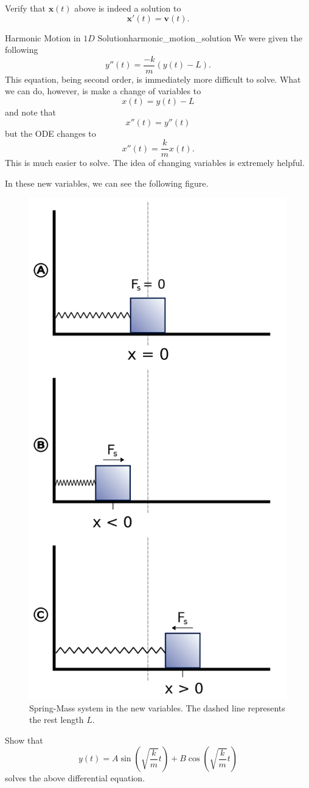         \begin{exercise}
        Verify that $\mathbf{x}(t)$ above is indeed a solution to 
        \[
        \mathbf{x}'(t)=\mathbf{v}(t).
        \]
        \end{exercise}
        
        \begin{ex}{Harmonic Motion in $1D$ Solution}{harmonic_motion_solution}
        We were given the following
        \[
        y''(t) = \frac{-k}{m} (y(t)-L).
        \]
        This equation, being second order, is immediately more difficult to solve.  What we can do, however, is make a change of variables to
        \[
        x(t)=y(t)-L
        \]
        and note that
        \[
        x''(t)=y''(t)
        \]
        but the ODE changes to
        \[
        x''(t)=\frac{k}{m}x(t).
        \]
        This is much easier to solve.  The idea of changing variables is extremely helpful.
        
        In these new variables, we can see the following figure.
        \begin{figure}[H]
            \centering
            \includegraphics[width=.4\textwidth]{Figures/spring-mass.png}
            \caption{Spring-Mass system in the new variables. The dashed line represents the rest length $L$.}
            \label{fig:my_label}
        \end{figure}
        \end{ex}
        
        \begin{exercise}
        Show that
        \[
        y(t) = A\sin\left(\sqrt{\frac{k}{m}}t\right)+B\cos\left( \sqrt{\frac{k}{m}}t\right)
        \]
        solves the above differential equation.
        \end{exercise}
        
